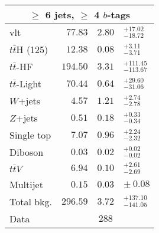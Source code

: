 \documentclass{article}[11pt,a4paper]
\begin{document}
\renewcommand{\arraystretch}{1.3}
\begin{tabular}{lr@{ $\pm$ }r@{ }l}
\multicolumn{4}{c}{$\geq$ 6 jets, $\geq$ 4 $b$-tags}\\
\hline\hline
vlt & $77.83$ & $2.80$& $^{+17.02}_{-18.72}$\\
\hline
$t\bar{t}$H (125) & $12.38$ & $0.08$& $^{+3.11}_{-3.71}$\\
$t\bar{t}$-HF & $194.50$ & $3.31$& $^{+111.45}_{-113.67}$\\
$t\bar{t}$-Light & $70.44$ & $0.64$& $^{+29.60}_{-31.06}$\\
$W$+jets & $4.57$ & $1.21$& $^{+2.74}_{-2.78}$\\
$Z$+jets & $0.51$ & $0.18$& $^{+0.33}_{-0.34}$\\
Single top & $7.07$ & $0.96$& $^{+2.24}_{-2.32}$\\
Diboson & $0.03$ & $0.02$& $^{+0.02}_{-0.02}$\\
$t\bar{t}$$V$ & $6.94$ & $0.10$& $^{+2.61}_{-2.69}$\\
Multijet & $0.15$ & $0.03$& $ \pm\ 0.08$\\
\hline
Total bkg. & $296.59$ & $3.72$ & $^{+137.10}_{-141.05}$\\
\hline
Data & \multicolumn{3}{c}{$288$} \\
\hline\hline
\end{tabular}
\vspace{0.5cm}
\end{document}
